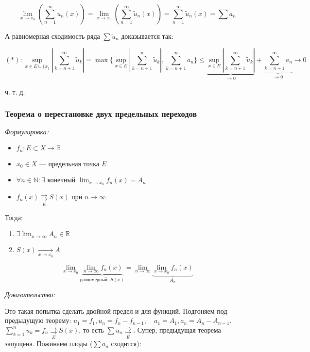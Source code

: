 \documentclass{article}
\def\rsh#1{\underset{#1}{\rightrightarrows}}
\def\rshe{\rsh{E}}
\begin{document}
\[\lim_{x \rightarrow x_0} \left(\sum_{n = 1}^{\infty} u_n(x) \right) = \lim_{x \rightarrow x_0} \left(\sum_{n = 1}^{\infty} \widetilde{u}_n(x) \right) = \sum_{n = 1}^{\infty} \widetilde{u}_n(x) = \sum a_n\]

А равномерная сходимость ряда $\sum \widetilde{u}_n$ доказывается так:

\[(*): \sup_{x \in E \cup \{x_\}} \left|\sum_{k = n + 1}^\infty \widetilde{u}_k \right| = \max\{\sup_{x \in E} \left|\sum_{k = n + 1}^\infty \widetilde{u}_k \right|, \sum_{k = n + 1}^\infty a_n\} \le \underbrace{\sup_{x \in E} \left|\sum_{k = n + 1}^\infty \widetilde{u}_k \right|}_{\rightarrow 0} + \underbrace{\sum_{k = n + 1}^\infty a_n}_{\rightarrow 0} \longrightarrow 0\]

ч. т. д.

\subsubsection{Теорема о перестановке двух предельных переходов}
\textit{Формулировка:}

\begin{itemize}
    \item $f_n: E \subset X \rightarrow \mathbb{R}$
    \item $x_0 \in X$ --- предельная точка $E$
    \item $\forall n \in \mathbb{N}: \exists$ конечный $\lim_{x \rightarrow x_0} f_n(x) = A_n$
    \item $f_n(x) \rshe S(x)$ при $n \rightarrow \infty$
\end{itemize}

Тогда: 

\begin{enumerate}
    \item $\exists \lim_{n \rightarrow \infty} A_n \in \mathbb{R}$
    \item $S(x) \underset{x \rightarrow x_0}{\longrightarrow} A$
\end{enumerate}

\[\lim_{x \rightarrow x_0} \underbrace{\lim_{n \rightarrow \infty}f_n(x)}_{\text{равномерный, } S(x)} =  \lim_{n \rightarrow \infty} \underbrace{\lim_{x \rightarrow x_0} f_n(x)}_{A_n}\]

\textit{Доказательство:}

Это такая попытка сделать двойной предел и для функций. Подгоняем под предыдущую теорему: $u_1 = f_1, u_n = f_n - f_{n - 1}, \quad a_1 = A_1, a_n = A_n - A_{n - 1}$. $\sum_{k = 1}^n u_k = f_n \rshe S(x)$, то есть $\sum u_n \rshe$. Супер, предыдущая теорема запущена. Пожинаем плоды ($\sum a_n$ сходится):
\end{document}
